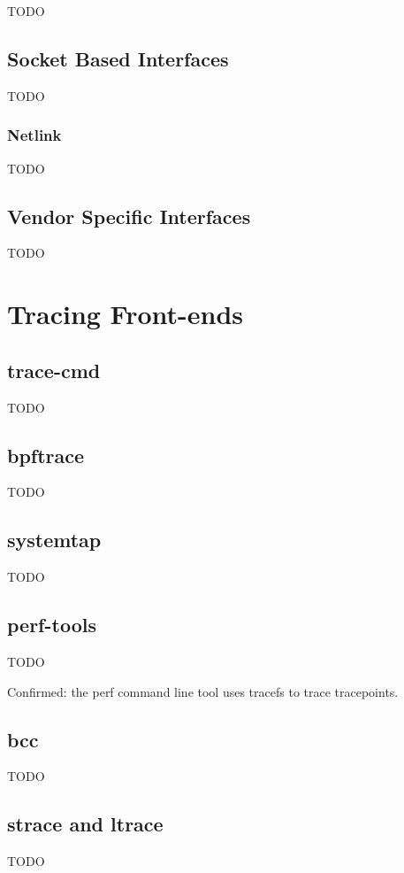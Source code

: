TODO

\subsection{Socket Based Interfaces}

TODO

\subsubsection*{Netlink}

TODO

\subsection{Vendor Specific Interfaces}

TODO



\section{Tracing Front-ends}

\subsection{trace-cmd}

TODO

\subsection{bpftrace}

TODO

\subsection{systemtap}

TODO

\subsection{perf-tools}

TODO

Confirmed: the perf command line tool uses tracefs to trace
tracepoints.

\subsection{bcc}

TODO

\subsection{strace and ltrace}

TODO
